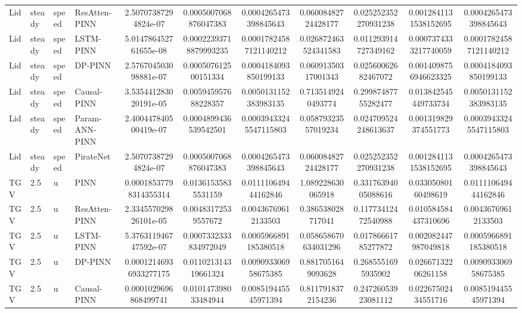 \begin{landscape}
\begin{longtable}{llllccccccc}
 Lid & steady & speed &  ResAtten-PINN &   2.50707387294824e-07 &  0.0005007068876047383 &  0.0004265473398845643 &  0.06008482724428177 &  0.025252352270931238 & 0.0012841131538152695 &  0.0004265473398845643 \\
 Lid & steady & speed &      LSTM-PINN &  5.014786452761655e-08 & 0.00022393718879993235 & 0.00017824587121140212 & 0.026872463524341583 &  0.011293914727349162 & 0.0007374333217740059 & 0.00017824587121140212 \\
 Lid & steady & speed &        DP-PINN &  2.576704503098881e-07 &   0.000507612500151334 &  0.0004184093850199133 &  0.06091350317001343 &   0.02560062682467072 & 0.0014098756946623325 &  0.0004184093850199133 \\
 Lid & steady & speed &    Causal-PINN &  3.535441283020191e-05 &   0.005945957688228357 &  0.0050131152383983135 &   0.7135149240493774 &   0.29987487755282477 &  0.013842545449733734 &  0.0050131152383983135 \\
 Lid & steady & speed & Param-ANN-PINN &  2.400447840500419e-07 &  0.0004899436539542501 & 0.00039433245547115803 &  0.05879323557019234 &  0.024709524248613637 &  0.001319829374551773 & 0.00039433245547115803 \\
 Lid & steady & speed &      PirateNet &   2.50707387294824e-07 &  0.0005007068876047383 &  0.0004265473398845643 &  0.06008482724428177 &  0.025252352270931238 & 0.0012841131538152695 &  0.0004265473398845643 \\
 TGV &    2.5 &     u &           PINN & 0.00018537798314355314 &    0.01361535835531159 &   0.011110649444162846 &    1.089228630065918 &   0.33176394005088616 &   0.03305080160498619 &   0.011110649444162846 \\
 TGV &    2.5 &     u &  ResAtten-PINN &  2.334557029826101e-05 &    0.00483172539557672 &    0.00436769612133503 &    0.386538028717041 &   0.11773412472540988 &  0.010584584437310696 &    0.00436769612133503 \\
 TGV &    2.5 &     u &      LSTM-PINN &  5.376311946747592e-07 &  0.0007332333834972049 &  0.0005966891185380518 & 0.058658670634031296 &   0.01786661785277872 &  0.002082447987049818 &  0.0005966891185380518 \\
 TGV &    2.5 &     u &        DP-PINN & 0.00012146936933277175 &   0.011021314319661324 &   0.009093306958675385 &   0.8817051649093628 &    0.2685551695935902 &   0.02667132206261158 &   0.009093306958675385 \\
 TGV &    2.5 &     u &    Causal-PINN &  0.0001029696868499741 &   0.010147398033484944 &   0.008519445545971394 &   0.8117918372154236 &   0.24726053923081112 &   0.02267502434551716 &   0.008519445545971394 \\

\end{longtable}
\end{landscape}
